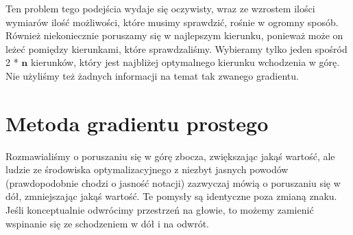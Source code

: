 Ten problem tego podejścia wydaje się oczywisty, wraz ze wzrostem ilości wymiarów ilość możliwości, które musimy sprawdzić, rośnie w ogromny sposób. Również niekoniecznie poruszamy się w najlepszym kierunku, ponieważ może on leżeć pomiędzy kierunkami, które sprawdzaliśmy. Wybieramy tylko jeden spośród 2 * $\boldsymbol{n}$
kierunków, który jest najbliżej optymalnego kierunku wchodzenia w górę. Nie użyliśmy też żadnych informacji na temat tak zwanego gradientu.\newline


\section{Metoda gradientu prostego}

Rozmawialiśmy o poruszaniu się w górę zbocza, zwiększając jakąś wartość, ale ludzie ze środowiska optymalizacyjnego z niezbyt jasnych powodów (prawdopodobnie chodzi o jasność notacji) zazwyczaj mówią o poruszaniu się w dół, zmniejszając jakąś wartość. Te pomysły są identyczne poza zmianą znaku. Jeśli konceptualnie odwrócimy przestrzeń na głowie, to możemy zamienić wspinanie się ze schodzeniem w dół i na odwrót.\newline

